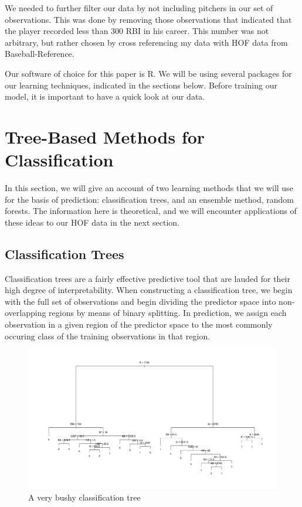 \documentclass[preprint,12pt]{elsarticle}
\begin{document}
We needed to further filter our data by not including pitchers in our set of observations. This was done by removing those observations that indicated that the player recorded less than 300 RBI in his career. This number was not arbitrary, but rather chosen by cross referencing my data with HOF data from Baseball-Reference.

Our software of choice for this paper is R. We will be using several packages for our learning techniques, indicated in the sections below. Before training our model, it is important to have a quick look at our data.





\section{Tree-Based Methods for Classification}

In this section, we will give an account of two learning methods that we will use for the basis of prediction: classification trees, and an ensemble method, random forests. The information here is theoretical, and we will encounter applications of these ideas to our HOF data in the next section.

\subsection{Classification Trees}
Classification trees are a fairly effective predictive tool that are lauded for their high degree of interpretability. When constructing a classification tree, we begin with the full set of observations and begin dividing the predictor space into non-overlapping regions by means of binary splitting. In prediction, we assign each observation in a given region of the predictor space to the most commonly occuring class of the training observations in that region. 

\begin{figure}[h]
	\centering
	\includegraphics[width=1\textwidth]{Rplot}
	\caption{A very bushy classification tree}
\end{figure}
\end{document}
